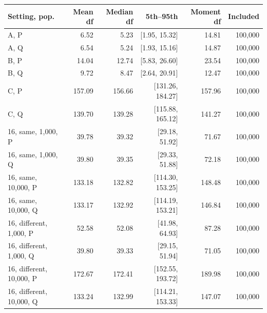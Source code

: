 \begin{tabular}{@{}lrrrrr@{}}
\toprule
Setting, pop. & Mean df & Median df & 5th--95th & Moment df & Included\\
\midrule
A, P & 6.52 & 5.23 & [1.95, 15.32] & 14.81 & 100,000\\
A, Q & 6.54 & 5.24 & [1.93, 15.16] & 14.87 & 100,000\\
B, P & 14.04 & 12.74 & [5.83, 26.60] & 23.54 & 100,000\\
B, Q & 9.72 & 8.47 & [2.64, 20.91] & 12.47 & 100,000\\
C, P & 157.09 & 156.66 & [131.26, 184.27] & 157.96 & 100,000\\
C, Q & 139.70 & 139.28 & [115.88, 165.12] & 141.27 & 100,000\\
16, same, 1,000, P & 39.78 & 39.32 & [29.18, 51.92] & 71.67 & 100,000\\
16, same, 1,000, Q & 39.80 & 39.35 & [29.33, 51.88] & 72.18 & 100,000\\
16, same, 10,000, P & 133.18 & 132.82 & [114.30, 153.25] & 148.48 & 100,000\\
16, same, 10,000, Q & 133.17 & 132.92 & [114.19, 153.21] & 146.84 & 100,000\\
16, different, 1,000, P & 52.58 & 52.08 & [41.98, 64.93] & 87.28 & 100,000\\
16, different, 1,000, Q & 39.80 & 39.33 & [29.15, 51.94] & 71.05 & 100,000\\
16, different, 10,000, P & 172.67 & 172.41 & [152.55, 193.72] & 189.98 & 100,000\\
16, different, 10,000, Q & 133.24 & 132.99 & [114.21, 153.33] & 147.07 & 100,000\\
\bottomrule
\end{tabular}
